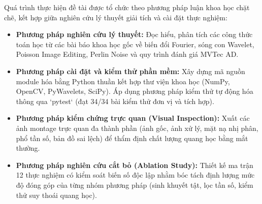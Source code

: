 Quá trình thực hiện đề tài được tổ chức theo phương pháp luận khoa học chặt chẽ, kết hợp giữa nghiên cứu lý thuyết giải tích và cài đặt thực nghiệm:
\begin{itemize}
    \item \textbf{Phương pháp nghiên cứu lý thuyết:} Đọc hiểu, phân tích các công thức toán học từ các bài báo khoa học gốc về biến đổi Fourier, sóng con Wavelet, Poisson Image Editing, Perlin Noise và quy trình đánh giá MVTec AD.
    \item \textbf{Phương pháp cài đặt và kiểm thử phần mềm:} Xây dựng mã nguồn module hóa bằng Python thuần kết hợp thư viện khoa học (NumPy, OpenCV, PyWavelets, SciPy). Áp dụng phương pháp kiểm thử tự động hóa thông qua `pytest` (đạt 34/34 bài kiểm thử đơn vị và tích hợp).
    \item \textbf{Phương pháp kiểm chứng trực quan (Visual Inspection):} Xuất các ảnh montage trực quan đa thành phần (ảnh gốc, ảnh xử lý, mặt nạ nhị phân, phổ tần số, bản đồ sai lệch) để thẩm định chất lượng quang học bằng mắt thường.
    \item \textbf{Phương pháp nghiên cứu cắt bỏ (Ablation Study):} Thiết kế ma trận 12 thực nghiệm có kiểm soát biến số độc lập nhằm bóc tách định lượng mức độ đóng góp của từng nhóm phương pháp (sinh khuyết tật, lọc tần số, kiểm thử suy thoái quang học).
\end{itemize}
